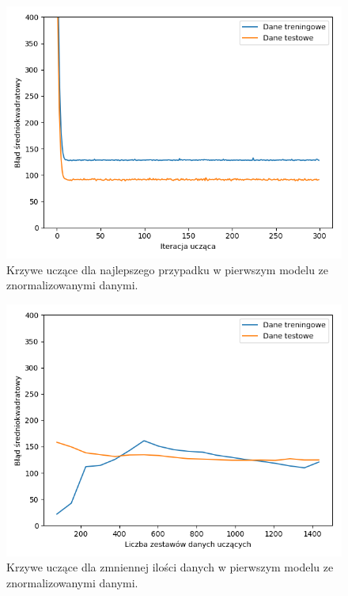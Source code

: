\documentclass[12pt]{aghdpl}
\newenvironment{tightcenter}{
  \setlength\topsep{0pt}
  \setlength\parskip{0pt}
  \begin{center}
}{
  \end{center}
}
\begin{document}
		\begin{figure}[h]
			\begin{tightcenter}
	 			\includegraphics[width = 0.75\linewidth]{wykresy/2_normalizacja_danych/wykres_uczenia.png}
	 		\end{tightcenter}
	 		
 			\caption{Krzywe uczące dla najlepszego przypadku w pierwszym modelu ze znormalizowanymi danymi.}
			\label{fig: pierwszy_model_wykres_uczenia_z_normalizacja}
		\end{figure}
		
		\begin{figure}[h]
			\begin{tightcenter}
	 			\includegraphics[width = 0.75\linewidth]{wykresy/2_normalizacja_danych/learning_curves.png}
	 		\end{tightcenter}
	 		
 			\caption{Krzywe uczące dla zmniennej ilości danych w pierwszym modelu ze znormalizowanymi danymi.}
			\label{fig: pierwszy_model_learning_curves_z_normalizacja}
		\end{figure}
		
\end{document}
